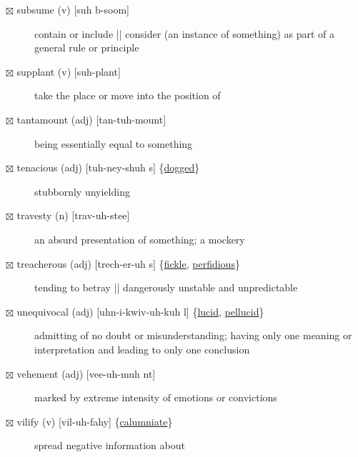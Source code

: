 \documentclass[11pt]{article}
\begin{document}
\begin{description}
\item[{$\boxtimes$ subsume (v) [suh b-soom]}] contain or include || consider (an instance of something) as part of a general rule or principle
\item[{$\boxtimes$ supplant (v) [suh-plant]}] take the place or move into the position of
\item[{$\boxtimes$ tantamount (adj) [tan-tuh-mount]}] being essentially equal to something
\item[{$\boxtimes$ \label{orgd39b1c3}tenacious (adj) [tuh-ney-shuh s] \{\hyperref[orgbdc7eb3]{dogged}\}}] stubbornly unyielding
\item[{$\boxtimes$ travesty (n) [trav-uh-stee]}] an absurd presentation of something; a mockery
\item[{$\boxtimes$ \label{orge60d40f}treacherous (adj) [trech-er-uh s] \{\hyperref[org93e669e]{fickle}, \hyperref[org7ac1415]{perfidious}\}}] tending to betray || dangerously unstable and unpredictable
\item[{$\boxtimes$ \label{org54a7180}unequivocal (adj) [uhn-i-kwiv-uh-kuh l] \{\hyperref[org6dfd5c3]{lucid}, \hyperref[org9cbc3b4]{pellucid}\}}] admitting of no doubt or misunderstanding; having only one meaning or interpretation and leading to only one conclusion
\item[{$\boxtimes$ vehement (adj) [vee-uh-muh nt]}] marked by extreme intensity of emotions or convictions
\item[{$\boxtimes$ \label{org8ab4e03} vilify (v) [vil-uh-fahy] \{\hyperref[orgb9e575e]{calumniate}\}}] spread negative information about
\end{description}
\end{document}
